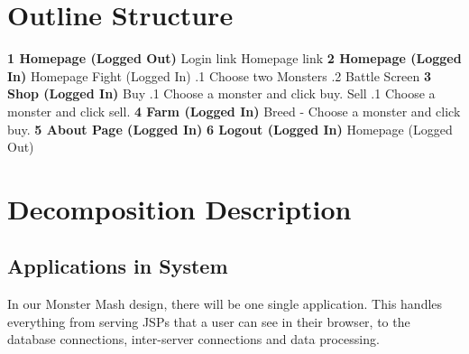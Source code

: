 \documentclass[titlepage]{article}
\begin{document}
\section{Outline Structure}
{\bf1 Homepage (Logged Out)} \newline
{} Login link \newline
{} Homepage link \newline
\newline
{\bf 2 Homepage (Logged In)}\newline
{} Homepage \newline
{} Fight (Logged In) \newline
\indent {}.1 Choose two Monsters
\newline
\indent {}.2 Battle Screen
\newline
\newline
{\bf 3 Shop (Logged In)}\newline
{} Buy \newline
\indent {}.1 Choose a monster and click buy.
\newline
{} Sell \newline
\indent {}.1 Choose a monster and click sell.
\newline
\newline
{\bf 4 Farm (Logged In)}\newline
{} Breed - Choose a monster and click buy. \newline
\newline
{\bf 5 About Page (Logged In)}\newline
\newline
{\bf 6 Logout (Logged In)}\newline
{} Homepage (Logged Out) \newline
\newline
\newpage


\section{Decomposition Description}
\subsection{Applications in System}
In our Monster Mash design, there will be one single application. This handles everything from serving JSPs that a user can see in their browser, to the database connections, inter-server connections and data processing.
\end{document}
